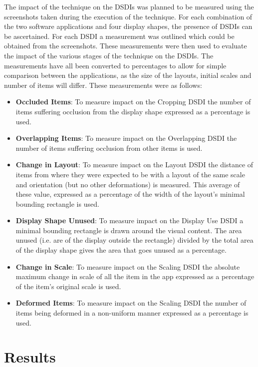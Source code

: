 \documentclass[twocolumn,compsoc]{cvm}
\begin{document}
{The impact of the technique on the \acp{DSDI} was planned to be measured using the screenshots taken during the execution of the technique.
For each combination of the two software applications and four display shapes, the presence of \acp{DSDI} can be ascertained.
For each \ac{DSDI} a measurement was outlined which could be obtained from the screenshots.
These measurements were then used to evaluate the impact of the various stages of the technique on the \acp{DSDI}.
The measurements have all been converted to percentages to allow for simple comparison between the applications, as the size of the layouts, initial scales and number of items will differ.
These measurements were as follows:
\begin{itemize}
  \item \textbf{Occluded Items}: 
  To measure impact on the Cropping \ac{DSDI} the number of items suffering occlusion from the display shape expressed as a percentage is used.
  \item \textbf{Overlapping Items}: 
  To measure impact on the Overlapping \ac{DSDI} the number of items suffering occlusion from other items is used.  
  \item \textbf{Change in Layout}: 
  To measure impact on the Layout \ac{DSDI} the distance of items from where they were expected to be with a layout of the same scale and orientation (but no other deformations) is measured.
  This average of these value, expressed as a percentage of the width of the layout's minimal bounding rectangle is used.
  \item \textbf{Display Shape Unused}: 
  To measure impact on the Display Use \ac{DSDI} a minimal bounding rectangle is drawn around the visual content.
  The area unused (i.e. are of the display outside the rectangle) divided by the total area of the display shape gives the area that goes unused as a percentage.
  \item \textbf{Change in Scale}: 
  To measure impact on the Scaling \ac{DSDI} the absolute maximum change in scale of all the item in the app expressed as a percentage of the item's original scale is used.
  \item \textbf{Deformed Items}: 
  To measure impact on the Scaling \ac{DSDI}  the number of items being deformed in a non-uniform manner expressed as a percentage is used.
\end{itemize}


\section{Results}
\label{sec:results}

}
\end{document}
